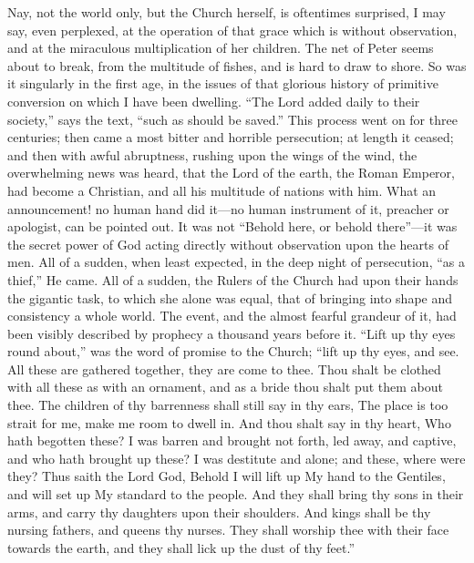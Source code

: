 Nay, not the world only, but the Church herself, is
oftentimes surprised, I may say, even perplexed, at the
operation of that grace which is without observation, and
at the miraculous multiplication of her children. The net
of Peter seems about to break, from the multitude of
fishes, and is hard to draw to shore. So was it
singularly in the first age, in the issues of that
glorious history of primitive conversion on which I have
been dwelling. ``The Lord added daily to their
society,'' says the text, ``such as should be
saved.'' This process went on for three centuries;
then came a most bitter and horrible persecution; at
length it ceased; and then with awful abruptness, rushing
upon the wings of the wind, the overwhelming news was
heard, that the Lord of the earth, the Roman Emperor, had
become a Christian, and all his multitude of nations with
him. What an announcement! no human hand did it—no
human instrument of it, preacher or apologist, can be
pointed out. It was not ``Behold here, or behold
there''—it was the secret power of God acting
directly without observation upon the hearts of men. All
of a sudden, when least expected, in the deep night of
persecution, ``as a thief,'' He came. All of a
sudden, the Rulers of the Church had upon their hands the
gigantic task, to which she alone was equal, that of
bringing into shape and consistency a whole world. The
event, and the almost fearful grandeur of it, had been
visibly described by prophecy a thousand years before it.
``Lift up thy eyes round about,'' was the word of
promise to the Church; ``lift up thy eyes, and see.
All these are gathered together, they are come to thee.
Thou shalt be clothed with all these as with an ornament,
and as a bride thou shalt put them about thee. The
children of thy barrenness shall still say in thy ears,
The place is too strait for me, make me room to dwell in.
And thou shalt say in thy heart, Who hath begotten these?
I was barren and brought not forth, led away, and
captive, and who hath brought up these? I was destitute
and alone; and these, where were they? Thus saith the
Lord God, Behold I will lift up My hand to the Gentiles,
and will set up My standard to the people. And they shall
bring thy sons in their arms, and carry thy daughters
upon their shoulders. And kings shall be thy nursing
fathers, and queens thy nurses. They shall worship thee
with their face towards the earth, and they shall lick up
the dust of thy feet.''

